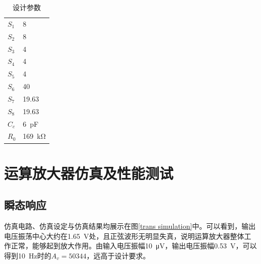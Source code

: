 \documentclass[UTF8]{ctexart}
\numberwithin{figure}{subsection}
\numberwithin{table}{subsection}
\numberwithin{equation}{subsection}
\begin{document}
\begin{table}[!ht]
    \centering 
    \begin{tabular}{l l}
    \toprule
        $S_1$ & 8\\ 
        $S_2$ & 8\\ 
        $S_3$ & 4\\ 
        $S_4$ & 4\\ 
        $S_5$ & 4\\ 
        $S_6$ & 40\\ 
        $S_7$ & 19.63\\
        $S_8$ & 19.63\\
        $C_c$ & \SI[]{6}{\pico\farad}\\
        $R_0$ & \SI[]{169}{\kilo\ohm}\\
    \bottomrule
    \end{tabular}
    \caption{设计参数}
    \label{design parameters}
\end{table}

\section{运算放大器仿真及性能测试}

\subsection{瞬态响应}
仿真电路、仿真设定与仿真结果均展示在图\ref{trans simulation}中。可以看到，输出电压振荡中心大约在\SI{1.65}{\volt}处，且正弦波形无明显失真，说明运算放大器整体工作正常，能够起到放大作用。由输入电压振幅\SI[]{10}{\micro\volt}，输出电压振幅\SI[]{0.53}{\volt}，可以得到\SI[]{10}{\hertz}时的\(A_v = 50344\)，远高于设计要求。
\end{document}
